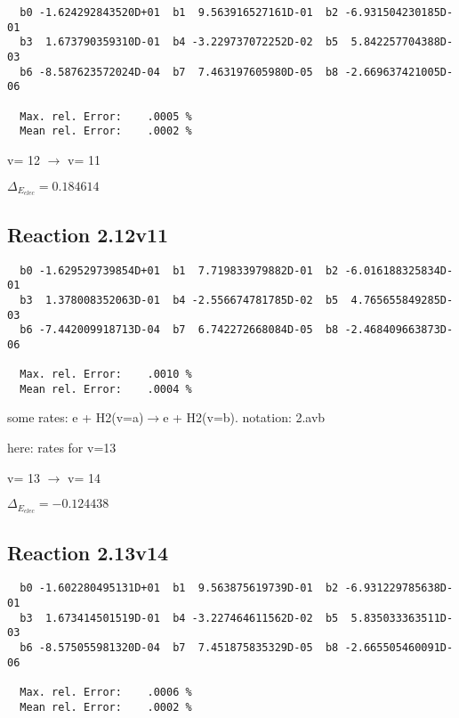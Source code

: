\documentclass[12pt]{article}
\begin{document}
\begin{small}\begin{verbatim}
  b0 -1.624292843520D+01  b1  9.563916527161D-01  b2 -6.931504230185D-01
  b3  1.673790359310D-01  b4 -3.229737072252D-02  b5  5.842257704388D-03
  b6 -8.587623572024D-04  b7  7.463197605980D-05  b8 -2.669637421005D-06

  Max. rel. Error:    .0005 %
  Mean rel. Error:    .0002 %

\end{verbatim}\end{small}

  v=  12 $\rightarrow$ v= 11

$\Delta_{E_{elec}}= 0.184614$


\subsection{
Reaction 2.12v11
}


\begin{small}\begin{verbatim}
  b0 -1.629529739854D+01  b1  7.719833979882D-01  b2 -6.016188325834D-01
  b3  1.378008352063D-01  b4 -2.556674781785D-02  b5  4.765655849285D-03
  b6 -7.442009918713D-04  b7  6.742272668084D-05  b8 -2.468409663873D-06

  Max. rel. Error:    .0010 %
  Mean rel. Error:    .0004 %

\end{verbatim}\end{small}
\newpage
some rates: e + H2(v=a)$\rightarrow$e + H2(v=b). notation: 2.avb

here: rates for v=13


  v=  13 $\rightarrow$ v= 14

$\Delta_{E_{elec}}=-0.124438$


\subsection{
Reaction 2.13v14
}


\begin{small}\begin{verbatim}
  b0 -1.602280495131D+01  b1  9.563875619739D-01  b2 -6.931229785638D-01
  b3  1.673414501519D-01  b4 -3.227464611562D-02  b5  5.835033363511D-03
  b6 -8.575055981320D-04  b7  7.451875835329D-05  b8 -2.665505460091D-06

  Max. rel. Error:    .0006 %
  Mean rel. Error:    .0002 %

\end{verbatim}\end{small}
\end{document}
